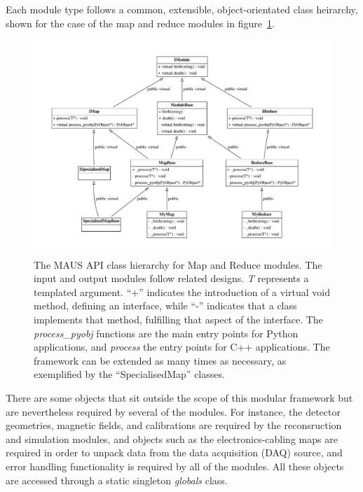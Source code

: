 \documentclass[11pt]{article}
\begin{document}
\noindent Each module type follows a common, extensible, object-orientated class heirarchy, shown for the case of the map and reduce modules in figure~\ref{fig:api}. 

\begin{figure}[!htb]
\centering
\includegraphics[width=1.0\textwidth]{figs/api.pdf}
\caption{The MAUS API class hierarchy for Map and Reduce modules. The input and output modules follow related designs. \emph{T} represents a templated argument. ``+'' indicates the introduction of a virtual void method, defining an interface, while ``-'' indicates that a class implements that method, fulfilling that aspect of the interface. The  \emph{process\_pyobj} functions are the main entry points for Python applications, and \emph{process} the entry points for C++ applications. The framework can be extended as many times as  necessary, as exemplified by the ``SpecialisedMap'' classes.}
\label{fig:api}
\end{figure}

There are some objects that sit outside the scope of this modular framework but are nevertheless required by several of the modules. For instance,  the detector geometries, magnetic fields, and calibrations are required by the reconsruction and simulation modules, and objects such as the electronics-cabling maps are required in order to unpack data from the data acquisition (DAQ) source, and error handling functionality is required by all of the modules. All these objects are accessed through a static singleton \emph{globals} class. 
\end{document}
